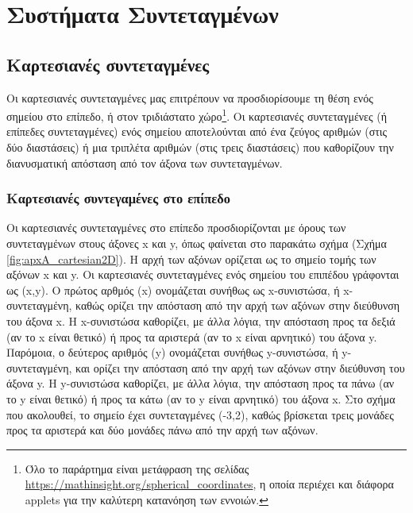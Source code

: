 \chapter{Συστήματα Συντεταγμένων}
\label{apx:coordinates}

\section{Καρτεσιανές συντεταγμένες}
Οι καρτεσιανές συντεταγμένες μας επιτρέπουν να προσδιορίσουμε τη θέση ενός σημείου στο επίπεδο, ή στον τριδιάστατο χώρο\footnote{Όλο το παράρτημα είναι μετάφραση της σελίδας \url{https://mathinsight.org/spherical_coordinates}, η οποία περιέχει και διάφορα applets για την καλύτερη κατανόηση των εννοιών.}. Οι καρτεσιανές συντεταγμένες (ή επίπεδες συντεταγμένες) ενός σημείου αποτελούνται από ένα ζεύγος αριθμών (στις δύο διαστάσεις) ή μια τριπλέτα αριθμών (στις τρεις διαστάσεις) που καθορίζουν την διανυσματική απόσταση από τον άξονα των συντεταγμένων.

\subsection{Καρτεσιανές συντεγαμένες στο επίπεδο}
Οι καρτεσιανές συντεταγμένες στο επίπεδο προσδιορίζονται με όρους των συντεταγμένων στους άξονες x και y, όπως φαίνεται στο παρακάτω σχήμα
(Σχήμα \ref{fig:apxA_cartesian2D}). Η αρχή των αξόνων ορίζεται ως το σημείο τομής των αξόνων x και y. Οι καρτεσιανές συντεταγμένες ενός σημείου του επιπέδου γράφονται ως (x,y). Ο πρώτος αρθμός (x) ονομάζεται συνήθως ως  x-συνιστώσα, ή x-συντεταγμένη, καθώς ορίζει την απόσταση από την αρχή των αξόνων στην διεύθυνση του άξονα x. Η x-συνιστώσα καθορίζει, με άλλα λόγια, την απόσταση προς τα δεξιά (αν το x είναι θετικό) ή προς τα αριστερά (αν το x είναι αρνητικό) του άξονα y. Παρόμοια, ο δεύτερος αριθμός (y) ονομάζεται συνήθως y-συνιστώσα, ή  y-συντεταγμένη, και ορίζει την απόσταση από την αρχή των αξόνων στην διεύθυνση του άξονα y. Η y-συνιστώσα καθορίζει, με άλλα λόγια, την απόσταση προς τα πάνω (αν το y είναι θετικό) ή προς τα κάτω (αν το y είναι αρνητικό) του άξονα x. Στο σχήμα που ακολουθεί, το σημείο έχει συντεταγμένες (-3,2), καθώς βρίσκεται τρεις μονάδες προς τα αριστερά και δύο μονάδες πάνω από την αρχή των αξόνων.

